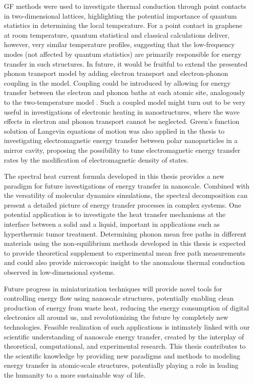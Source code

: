GF methods were used to investigate thermal conduction through point contacts in two-dimensional lattices, highlighting the potential importance of quantum statistics in determining the local temperature. For a point contact in graphene at room temperature, quantum statistical and classical calculations deliver, however, very similar temperature profiles, suggesting that the low-frequency modes (not affected by quantum statistics) are primarily responsible for energy transfer in such structures. In future, it would be fruitful to extend the presented phonon transport model by adding electron transport and electron-phonon coupling in the model. Coupling could be introduced by allowing for energy transfer between the electron and phonon baths at each atomic site, analogously to the two-temperature model \cite{chen01}. Such a coupled model might turn out to be very useful in investigations of electronic heating in nanostructures, where the wave effects in electron and phonon transport cannot be neglected. Green's function solution of Langevin equations of motion was also applied in the thesis to investigating electromagnetic energy transfer between polar nanoparticles in a mirror cavity, proposing the possibility to tune electromagnetic energy transfer rates by the modification of electromagnetic density of states. 

The spectral heat current formula developed in this thesis provides a new paradigm for future investigations of energy transfer in nanoscale. Combined with the versatility of molecular dynamics simulations, the spectral decomposition can present a detailed picture of energy transfer processes in complex systems. One potential application is to investigate the heat transfer mechanisms at the interface between a solid and a liquid, important in applications such as hyperthermic tumor treatment. Determining phonon mean free paths in different materials using the non-equilibrium methods developed in this thesis is expected to provide theoretical supplement to experimental mean free path measurements and could also provide microscopic insight to the anomalous thermal conduction observed in low-dimensional systems.

Future progress in miniaturization techniques will provide novel tools for controlling energy flow using nanoscale structures, potentially enabling clean production of energy from waste heat, reducing the energy consumption of digital electronics all around us, and revolutionizing the future by completely new technologies. Feasible realization of such applications is intimately linked with our scientific understanding of nanoscale energy transfer, created by the interplay of theoretical, computational, and experimental research. This thesis contributes to the scientific knowledge by providing new paradigms and methods to modeling energy transfer in atomic-scale structures, potentially playing a role in leading the humanity to a more sustainable way of life. 
